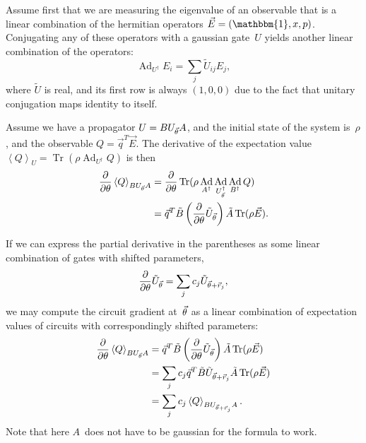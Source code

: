 \documentclass[aps,pra,10pt,twocolumn,groupedaddress,nofootinbib]{revtex4-1}
\theoremstyle{plain}
\DeclareMathOperator{\tr}{Tr}
\DeclareMathOperator{\Ad}{Ad}
\newcommand{\pd}[2]{\frac{\partial #1}{\partial #2}}  %
\newcommand{\be}{\begin{equation}}
\newcommand{\ee}{\end{equation}}
\newcommand{\I}{\mathbbm{1}} %
\newcommand{\expect}[1]{\ensuremath{\left\langle #1 \right\rangle}} %
\newcommand{\Admap}[1]{\tilde{#1}} %
\begin{document}
Assume first that we are measuring the eigenvalue of an observable that is a linear combination of the hermitian operators $\vec{E} = (\I, x, p)$.
Conjugating any of these operators with a gaussian gate~$U$ yields another linear combination of the operators:
\be
\Ad_{U^\dagger} E_i = \sum_j \Admap{U}_{ij} E_j,
\ee
where $\Admap{U}$ is real, and its first row
is always $(1,0,0)$ due to the fact that unitary conjugation maps identity to itself.

Assume we have a propagator $U=B U_{\vt} A$, and the initial state of the system is~$\rho$,
and the observable $Q = \vec{q}^T \vec{E}$.
The derivative of the expectation value
$\expect{Q}_U = \tr(\rho \Ad_{U^\dagger}Q)$
is then
\begin{align*}
  \pd{}{\theta} \expect{Q}_{B U_{\vt} A}
  &= \pd{}{\theta} \tr(\rho \Ad_{A^\dagger} \Ad_{U_{\vt}^\dagger} \Ad_{B^\dagger} Q)\\
  &= \vec{q}^T \Admap{B} \left(\pd{}{\theta} \Admap{U}_{\vt}\right) \Admap{A} \tr(\rho \vec{E}).
\end{align*}

If we can express the partial derivative in the parentheses as some linear combination of gates with shifted parameters,
\be
\label{eq:d_cv_shift}
\pd{}{\theta} \Admap{U}_{\vt} = \sum_j c_j \Admap{U}_{\vt+\vR_j},
\ee
we may compute the circuit gradient at~$\vt$ as a linear combination of expectation values
of circuits with correspondingly shifted parameters:
\begin{align}
\label{eq:d_ev1_cv}
\notag
\pd{}{\theta} \expect{Q}_{B U_{\vt} A}
&= \vec{q}^T \Admap{B} \left(\pd{}{\theta} \Admap{U}_{\vt}\right) \Admap{A} \tr(\rho \vec{E})\\
\notag
&= \sum_j c_j \vec{q}^T \Admap{B} \Admap{U}_{\vt+\vR_j} \Admap{A} \tr(\rho \vec{E})\\
&= \sum_j c_j \expect{Q}_{B U_{\vt+\vR_j} A}.
\end{align}
Note that here $A$~does not have to be gaussian for the formula to work.
\end{document}
